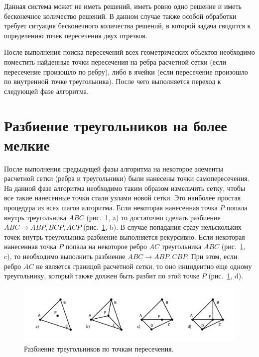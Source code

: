 \documentclass[
11pt,%
tightenlines,%
twoside,%
onecolumn,%
nofloats,%
nobibnotes,%
nofootinbib,%
superscriptaddress,%
noshowpacs,%
centertags]%
{revtex4}
\begin{document}
Данная система может не иметь решений, иметь ровно одно решение и иметь бесконечное количество решений.
В данном случае также особой обработки требует ситуация бесконечного количества решений, в которой задача сводится к определению точек пересечения двух отрезков.

После выполнения поиска пересечений всех геометрических объектов необходимо поместить найденные точки пересечения на ребра расчетной сетки (если пересечение произошло по ребру), либо в ячейки (если пересечение произошло по внутренной точке треугольника).
После чего выполняется переход к следующей фазе алгоритма.

\section{Разбиение треугольников на более мелкие}

После выполнения предыдущей фазы алгоритма на некоторое элементы расчетной сетки (ребра и треугольники) были нанесены точки самопересечения.
На данной фазе алгоритма необходимо таким образом измельчить сетку, чтобы все такие нанесенные точки стали узлами новой сетки.
Это наиболее простая процедура из всех шагов алгоритма.
Если некоторая нанесенная точка $P$ попала внутрь треугольника $ABC$ (рис.~\ref{fig:pic_split_s}, a) то достаточно сделать разбиение $ABC \rightarrow ABP, BCP, ACP$ (рис.~\ref{fig:pic_split_s}, b).
В случае попадания сразу нельскольких точек внутрь треугольника разбиение выполняется рекурсивно.
Если некоторая нанесенная точка $P$ попала на некоторое ребро $AC$ треугольника $ABC$ (рис.~\ref{fig:pic_split_s}, c), то необходимо выполнить разбиение $ABC \rightarrow ABP, CBP$.
При этом, если ребро $AC$ не является границой расчетной сетки, то оно инцидентно еще одному треугольнику, который также должен быть разбит по этой точке $P$ (рис.~\ref{fig:pic_split_s}, d).

\begin{figure}[h]
\includegraphics[width=1.0\textwidth]{pics/pic_split_s.pdf}
\caption{Разбиение треугольников по точкам пересечения.}\label{fig:pic_split_s}
\end{figure}
\end{document}
